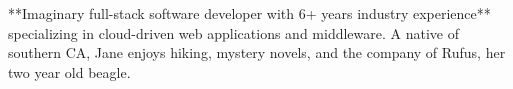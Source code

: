 


\begin{cvparagraph}
**Imaginary full-stack software developer with 6+ years industry experience** specializing in cloud-driven web applications and middleware. A native of southern CA, Jane enjoys hiking, mystery novels, and the company of Rufus, her two year old beagle.
\end{cvparagraph}

